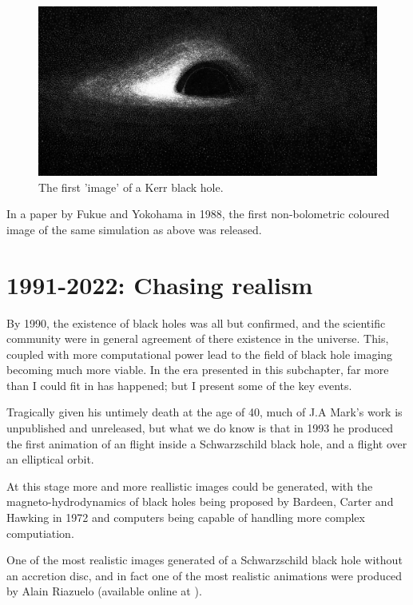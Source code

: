 \documentclass[oneside,openright,frontopenright, singlespacing]{dmathesis}
\begin{document}
\begin{figure}[!ht]
	\centering
	\includegraphics[width=0.5\linewidth]{img/Luminet-drawing}
	\caption{The first 'image' of a Kerr black hole. \cite{luminet1979image}}
\end{figure}

\vspace{1em}
	In a paper by Fukue and Yokohama in 1988, the first non-bolometric coloured image of the same simulation as above was released\cite{fukue1988color}.

\section{1991-2022: Chasing realism}

	By 1990, the existence of black holes was all but confirmed, and the scientific community were in general agreement of there existence in the universe. This, coupled with more computational power lead to the field of black hole imaging becoming much more viable. In the era presented in this subchapter, far more than I could fit in has happened; but I present some of the key events.

\vspace{1em}
	Tragically given his untimely death at the age of 40, much of J.A Mark's work is unpublished and unreleased, but what we do know is that in 1993 he produced the first animation of an flight inside a Schwarzschild black hole, and a flight over an elliptical orbit\cite{InfinitelyCurved}.

\vspace{1em}
	At this stage more and more reallistic images could be generated, with the magneto-hydrodynamics of black holes being proposed by Bardeen, Carter and Hawking in 1972\cite{bardeen1973four} and computers being capable of handling more complex computiation.

\vspace{1em}
	One of the most realistic images generated of a Schwarzschild black hole without an accretion disc, and in fact one of the most realistic animations were produced by Alain Riazuelo (available online at \cite{riazuelo2014black}).
\end{document}
